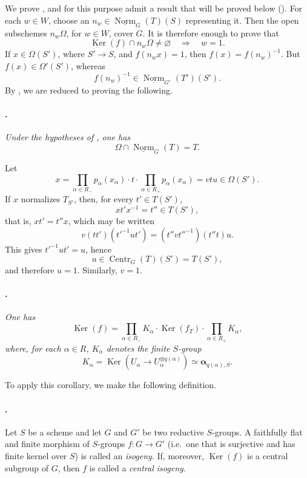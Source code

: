 We prove \textup{}, and for this purpose admit a result that will
be proved below \textup{()}. For each \(w\in W\), choose an
\(n_w\in\underline{\operatorname{Norm}}_G(T)(S)\) representing it.
Then the open subschemes \(n_w\Omega\), for \(w\in W\), cover \(G\).
It is therefore enough to prove that
\[
  \operatorname{Ker}(f)\cap n_w\Omega\ne\varnothing
  \quad\Longrightarrow\quad w=1.
\]
If \(x\in\Omega(S')\), where \(S'\to S\), and \(f(n_wx)=1\), then
\(f(x)=f(n_w)^{-1}\). But \(f(x)\in\Omega'(S')\), whereas
\[
  f(n_w)^{-1}\in
  \underline{\operatorname{Norm}}_{G'}(T')(S').
\]
By , we are reduced to proving the following.

\paragraph{.}
\textit{Under the hypotheses of , one has}
\[
  \Omega\cap\underline{\operatorname{Norm}}_G(T)=T.
\]

Let
\[
  x=
  \prod_{\alpha\in R_-}p_\alpha(x_\alpha)
  \mathbin{\cdot}t\mathbin{\cdot}
  \prod_{\alpha\in R_+}p_\alpha(x_\alpha)
  =
  vtu
  \in\Omega(S').
\]
If \(x\) normalizes \(T_{S'}\), then, for every \(t'\in T(S')\),
\[
  xt'x^{-1}=t''\in T(S'),
\]
that is, \(xt'=t''x\), which may be written
\[
  v(tt')(t'^{-1}ut')
  =
  (t''vt''^{-1})(t''t)u.
\]
This gives \(t'^{-1}ut'=u\), hence
\[
  u\in\operatorname{Centr}_G(T)(S')=T(S'),
\]
and therefore \(u=1\). Similarly, \(v=1\).

\paragraph{.}
\textit{One has}
\[
  \operatorname{Ker}(f)
  =
  \prod_{\alpha\in R_-}K_\alpha
  \mathbin{\cdot}\operatorname{Ker}(f_T)\mathbin{\cdot}
  \prod_{\alpha\in R_+}K_\alpha,
\]
\textit{where, for each \(\alpha\in R\), \(K_\alpha\) denotes the
finite \(S\)-group}
\[
  K_\alpha
  =
  \operatorname{Ker}\!\left(
    U_\alpha\longrightarrow U_\alpha^{\otimes q(\alpha)}
  \right)
  \simeq
  \boldsymbol{\alpha}_{q(\alpha),S}.
\]

To apply this corollary, we make the following definition.

\paragraph{.}
Let \(S\) be a scheme and let \(G\) and \(G'\) be two reductive
\(S\)-groups. A faithfully flat and finite morphism of \(S\)-groups
\(f:G\to G'\) \textup{(i.e.\ one that is surjective and has finite
kernel over \(S\))} is called an \emph{isogeny}. If, moreover,
\(\operatorname{Ker}(f)\) is a central subgroup of \(G\), then \(f\)
is called a \emph{central isogeny}.

